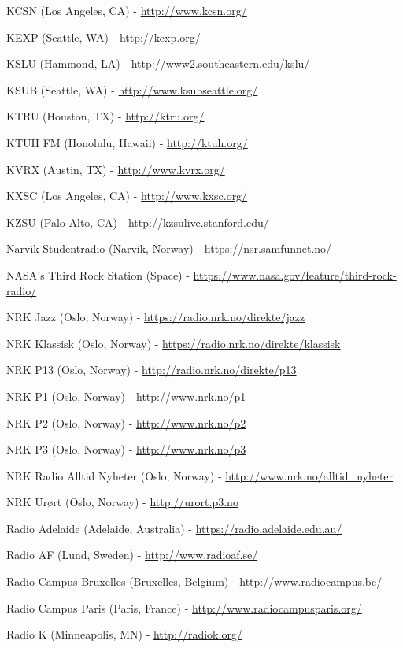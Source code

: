 \documentclass[20pt,landscape]{foils}
\begin{document}
\begin{list1}
\begin{list2}
  \item KCSN (Los Angeles, CA) - \url{http://www.kcsn.org/}
  \item KEXP (Seattle, WA) - \url{http://kexp.org/}
  \item KSLU (Hammond, LA) - \url{http://www2.southeastern.edu/kslu/}
  \item KSUB (Seattle, WA) - \url{http://www.ksubseattle.org/}
  \item KTRU (Houston, TX) - \url{http://ktru.org/}
  \item KTUH FM (Honolulu, Hawaii) - \url{http://ktuh.org/}
  \item KVRX (Austin, TX) - \url{http://www.kvrx.org/}
  \item KXSC (Los Angeles, CA) - \url{http://www.kxsc.org/}
  \item KZSU (Palo Alto, CA) - \url{http://kzsulive.stanford.edu/}
  \item Narvik Studentradio (Narvik, Norway) - \url{https://nsr.samfunnet.no/}
  \item NASA's Third Rock Station (Space) - \url{https://www.nasa.gov/feature/third-rock-radio/}
  \item NRK Jazz (Oslo, Norway) - \url{https://radio.nrk.no/direkte/jazz}
  \item NRK Klassisk (Oslo, Norway) - \url{https://radio.nrk.no/direkte/klassisk}
  \item NRK P13 (Oslo, Norway) - \url{http://radio.nrk.no/direkte/p13}
  \item NRK P1 (Oslo, Norway) - \url{http://www.nrk.no/p1}
  \item NRK P2 (Oslo, Norway) - \url{http://www.nrk.no/p2}
  \item NRK P3 (Oslo, Norway) - \url{http://www.nrk.no/p3}
  \item NRK Radio Alltid Nyheter (Oslo, Norway) - \url{http://www.nrk.no/alltid_nyheter}
  \item NRK Urørt (Oslo, Norway) - \url{http://urort.p3.no}
  \item Radio Adelaide (Adelaide, Australia) - \url{https://radio.adelaide.edu.au/}
  \item Radio AF (Lund, Sweden) - \url{http://www.radioaf.se/}
  \item Radio Campus Bruxelles (Bruxelles, Belgium) - \url{http://www.radiocampus.be/}
  \item Radio Campus Paris (Paris, France) - \url{http://www.radiocampusparis.org/}
  \item Radio K (Minneapolis, MN) - \url{http://radiok.org/}

\end{list2}
\end{list1}
\end{document}
